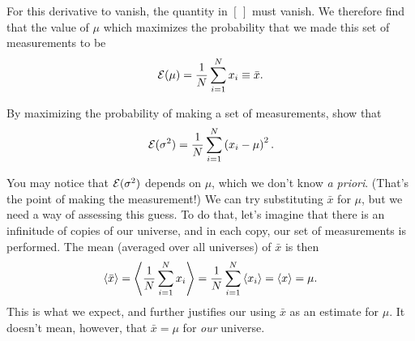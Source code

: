 For this derivative to vanish, the quantity in $\left[\,\right]$ must vanish.
We therefore find that the value of $\mu$ which maximizes the probability that we made this set of measurements to be
\begin{equation}
	\mathcal{E}(\mu) = \frac{1}{N}\sum_{i=1}^{N}x_{i} \equiv \bar{x}.
\end{equation}
\begin{exercisebox}
By maximizing the probability of making a set of measurements, show that
\[
 \mathcal{E}(\sigma^{2}) = \frac{1}{N}\sum_{i=1}^{N}\left(x_{i}-\mu\right)^{2}.
\]
\end{exercisebox}

You may notice that $\mathcal{E}(\sigma^{2})$ depends on $\mu$, which we don't know \emph{a priori}. (That's the point of making the measurement!) We can try substituting $\bar{x}$ for $\mu$, but we need a way of assessing this guess. To do that, let's imagine that there is an infinitude of copies of our universe, and in each copy, our set of measurements is performed. The mean (averaged over all universes) of $\bar{x}$ is then
\[
\left\langle\bar{x}\right\rangle = \left\langle\frac{1}{N}\sum_{i=1}^{N}x_{i}\right\rangle = \frac{1}{N}\sum_{i=1}^{N}\left\langle x_{i}\right\rangle = \left\langle x\right\rangle = \mu.
\]
This is what we expect, and further justifies our using $\bar{x}$ as an estimate for $\mu$. It doesn't mean, however, that $\bar{x} = \mu$ for \emph{our} universe.

